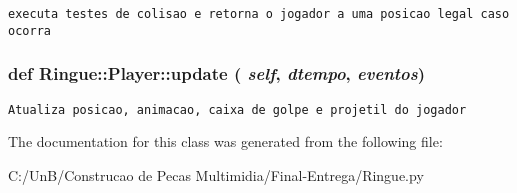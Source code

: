 \begin{footnotesize}\begin{verbatim}executa testes de colisao e retorna o jogador a uma posicao legal caso ocorra \end{verbatim}
\end{footnotesize}
 \hypertarget{class_ringue_1_1_player_9fa5d2bc228a1cad2e92a51b47a9379e}{
\subsubsection[{update}]{\setlength{\rightskip}{0pt plus 5cm}def Ringue::Player::update ( {\em self}, \/   {\em dtempo}, \/   {\em eventos})}}
\label{class_ringue_1_1_player_9fa5d2bc228a1cad2e92a51b47a9379e}




\begin{footnotesize}\begin{verbatim}Atualiza posicao, animacao, caixa de golpe e projetil do jogador \end{verbatim}
\end{footnotesize}
 

The documentation for this class was generated from the following file:\begin{CompactItemize}
\item 
C:/UnB/Construcao de Pecas Multimidia/Final-Entrega/Ringue.py\end{CompactItemize}
